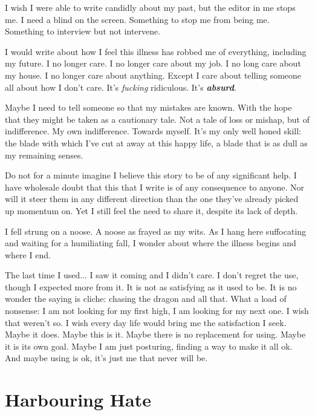 \documentclass[fontsize=12pt,english]{scrreprt}
\begin{document}
I wish I were able to write candidly about my past, but the editor in
me stops me. I need a blind on the screen. Something to stop me from
being me. Something to interview but not intervene.


I would write about how I feel this illness has robbed me of
everything, including my future. I no longer care. I no longer care
about my job. I no long care about my house. I no longer care about
anything. Except I care about telling someone all about how I don't
care. It's \textit{fucking} ridiculous. It's \textbf{\textit{absurd}}.

Maybe I need to tell someone so that my mistakes are known. With the
hope that they might be taken as a cautionary tale. Not a tale of loss
or mishap, but of indifference. My own indifference. Towards
myself. It's my only well honed skill: the blade with which I've cut
at away at this happy life, a blade that is as dull as my remaining
senses.

Do not for a minute imagine I believe this story to be of any
significant help. I have wholesale doubt that this that I write is of
any consequence to anyone.  Nor will it steer them in any different
direction than the one they've already picked up momentum on. Yet I
still feel the need to share it, despite its lack of depth.


I fell strung on a noose. A noose as frayed as my wits. As I hang here
suffocating and waiting for a humiliating fall, I wonder about where
the illness begins and where I end.

The last time I used... I saw it coming and I didn't care. I don't
regret the use, though I expected more from it. It is not as
satisfying as it used to be. It is no wonder the saying is cliche:
chasing the dragon and all that. What a load of nonsense: I am not
looking for my first high, I am looking for my next one. I wish that
weren't so. I wish every day life would bring me the satisfaction I
seek. Maybe it does. Maybe this is it.  Maybe there is no replacement
for using. Maybe it is its own goal. Maybe I am just posturing,
finding a way to make it all ok. And maybe using is ok, it's just me
that never will be.

\newpage

\section{Harbouring Hate}
\end{document}
